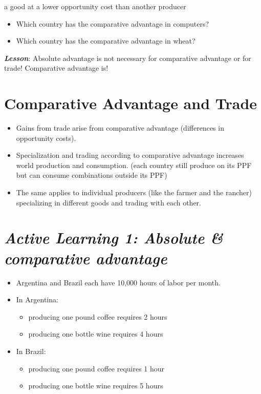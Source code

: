 \documentclass[
]{book}
\providecommand{\tightlist}{%
  \setlength{\itemsep}{0pt}\setlength{\parskip}{0pt}}
\begin{document}
a good at a lower opportunity cost than another producer

\begin{itemize}
\item
  Which country has the comparative advantage in computers?
\item
  Which country has the comparative advantage in wheat?
\end{itemize}

\bigskip

\textbf{\emph{Lesson}}: Absolute advantage is not necessary for comparative advantage or for trade! Comparative advantage is!

\hypertarget{comparative-advantage-and-trade}{%
\section{Comparative Advantage and Trade}\label{comparative-advantage-and-trade}}

\begin{itemize}
\item
  Gains from trade arise from comparative advantage (differences in opportunity costs).
\item
  Specialization and trading according to comparative advantage increases world production and consumption. (each country still produce on its PPF but can consume combinations outside its PPF)
\item
  The same applies to individual producers (like the farmer and the rancher) specializing in different goods and trading with each other.
\end{itemize}

\hypertarget{active-learning-1-absolute-comparative-advantage}{%
\section{\texorpdfstring{\emph{Active Learning 1: Absolute \& comparative advantage}}{Active Learning 1: Absolute \& comparative advantage}}\label{active-learning-1-absolute-comparative-advantage}}

\begin{itemize}
\item
  Argentina and Brazil each have 10,000 hours of labor per month.
\item
  In Argentina:

  \begin{itemize}
  \tightlist
  \item
    producing one pound coffee requires 2 hours
  \item
    producing one bottle wine requires 4 hours
  \end{itemize}
\item
  In Brazil:

  \begin{itemize}
  \tightlist
  \item
    producing one pound coffee requires 1 hour
  \item
    producing one bottle wine requires 5 hours
  \end{itemize}
\end{itemize}
\end{document}
